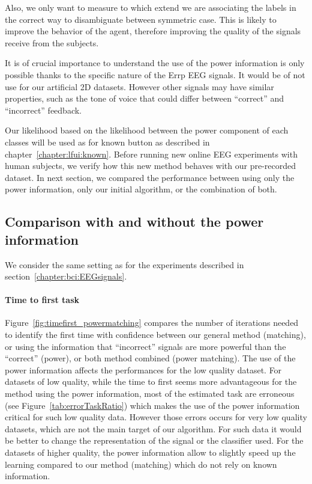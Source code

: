 Also, we only want to measure to which extend we are associating the labels in the correct way to disambiguate between symmetric case. This is likely to improve the behavior of the agent, therefore improving the quality of the signals receive from the subjects. 

It is of crucial importance to understand the use of the power information is only possible thanks to the specific nature of the Errp EEG signals. It would be of not use for our artificial 2D datasets. However other signals may have similar properties, such as the tone of voice that could differ between ``correct'' and ``incorrect'' feedback.

Our likelihood based on the likelihood between the power component of each classes will be used as for known button as described in chapter~\ref{chapter:lfui:known}. Before running new online EEG experiments with human subjects, we verify how this new method behaves with our pre-recorded dataset. In next section, we compared the performance between using only the power information, only our initial algorithm, or the combination of both.

\subsection{Comparison with and without the power information}

We consider the same setting as for the experiments described in section~\ref{chapter:bci:EEGsignals}. 

\paragraph{Time to first task} Figure~\ref{fig:timefirst_powermatching} compares the number of iterations needed to identify the first time with confidence between our general method (matching), or using the information that ``incorrect'' signals are more powerful than the ``correct'' (power), or both method combined (power matching). The use of the power information affects the performances for the low quality dataset. For datasets of low quality, while the time to first seems more advantageous for the method using the power information, most of the estimated task are erroneous (see Figure~\ref{tab:errorTaskRatio}) which makes the use of the power information critical for such low quality data. However those errors occurs for very low quality datasets, which are not the main target of our algorithm. For such data it would be better to change the representation of the signal or the classifier used. For the datasets of higher quality, the power information allow to slightly speed up the learning compared to our method (matching) which do not rely on known information. 

